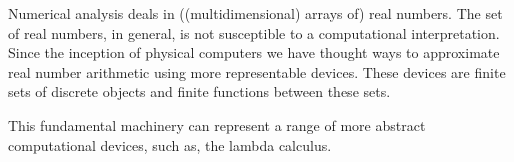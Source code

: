 Numerical analysis deals in ((multidimensional) arrays of) real numbers. The
set of real numbers, in general, is not susceptible to a computational
interpretation\cite{turing-1936-7-computability}. Since the inception of
physical computers we have thought ways to approximate real number arithmetic
using more representable devices. These devices are finite sets of discrete
objects and finite functions between these sets.

This fundamental machinery can represent a range of more abstract computational
devices, such as, the lambda calculus.



